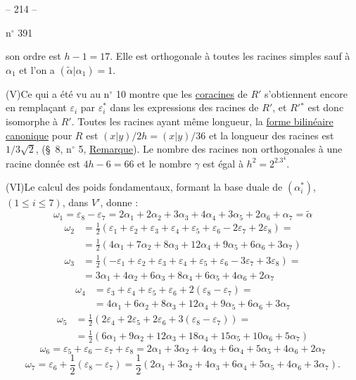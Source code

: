 \begin{center}-- 214 --\end{center}
\hfill n$^\circ$ 391

son ordre est $h-1=17$. Elle est orthogonale à toutes les racines simples
sauf à $\alpha_1$ et l'on a $(\tilde\alpha|\alpha_1)=1$.

(V)\quad Ce qui a été vu au n$^\circ$ 10 montre que les \uline{coracines} de $R'$
s'obtiennent encore en remplaçant $\varepsilon_i$ par $\varepsilon_i^*$
dans les expressions des racines de $R'$, et $R'{}^*$ est donc isomorphe à $R'$.
Toutes les racines ayant même longueur, la \uline{forme bilinéaire canonique}
pour $R$ est $(x|y)/2h=(x|y)/36$ et la longueur des racines est
$1/3\sqrt2$, (\S\ 8, n$^\circ$ 5, \uline{Remarque}).
Le nombre des racines non orthogonales à une racine donnée est
$4h-6=66$ et le nombre $\gamma$ est égal à $h^2=2^2.3^4$.

(VI)\quad Le calcul des poids fondamentaux, formant la base duale de
$(\alpha_i^*)$, $(1\leq i\leq7)$, dans $V'$, donne :
\[
\omega_1=\varepsilon_8-\varepsilon_7
=2\alpha_1+2\alpha_2+3\alpha_3+4\alpha_4+3\alpha_5+2\alpha_6+\alpha_7
=\tilde\alpha
\]
\[
\begin{aligned}
\omega_2&=\frac12(\varepsilon_1+\varepsilon_2+\varepsilon_3+\varepsilon_4+
\varepsilon_5+\varepsilon_6-2\varepsilon_7+2\varepsilon_8)=\\
&=\frac12(4\alpha_1+7\alpha_2+8\alpha_3+12\alpha_4+9\alpha_5+6\alpha_6+3\alpha_7)
\end{aligned}
\]
\[
\begin{aligned}
\omega_3&=\frac12(-\varepsilon_1+\varepsilon_2+\varepsilon_3+\varepsilon_4+
\varepsilon_5+\varepsilon_6-3\varepsilon_7+3\varepsilon_8)=\\
&=3\alpha_1+4\alpha_2+6\alpha_3+8\alpha_4+6\alpha_5+4\alpha_6+2\alpha_7
\end{aligned}
\]
\[
\begin{aligned}
\omega_4&=\varepsilon_3+\varepsilon_4+\varepsilon_5+\varepsilon_6+
2(\varepsilon_8-\varepsilon_7)=\\
&=4\alpha_1+6\alpha_2+8\alpha_3+12\alpha_4+9\alpha_5+6\alpha_6+3\alpha_7
\end{aligned}
\]
\[
\begin{aligned}
\omega_5&=\frac12(2\varepsilon_4+2\varepsilon_5+2\varepsilon_6+
3(\varepsilon_8-\varepsilon_7))=\\
&=\frac12(6\alpha_1+9\alpha_2+12\alpha_3+18\alpha_4+15\alpha_5+10\alpha_6+5\alpha_7)
\end{aligned}
\]
\[
\omega_6=\varepsilon_5+\varepsilon_6-\varepsilon_7+\varepsilon_8
=2\alpha_1+3\alpha_2+4\alpha_3+6\alpha_4+5\alpha_5+4\alpha_6+2\alpha_7
\]
\[
\omega_7=\varepsilon_6+\frac12(\varepsilon_8-\varepsilon_7)
=\frac12(2\alpha_1+3\alpha_2+4\alpha_3+6\alpha_4+5\alpha_5+4\alpha_6+3\alpha_7).
\]
